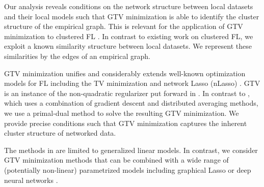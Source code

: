 \documentclass[lettersize,journal]{IEEEtran}
\begin{document}

Our analysis reveals conditions on the network structure between local datasets and their 
local models such that GTV minimization is able to identify the cluster structure of the empirical graph. 
This is relevant for the application of GTV minimization to clustered FL \cite{NIPS2008_fccb3cdc,Ghosh2020}. 
In contrast to existing work on clustered FL, we exploit a known similarity structure between local 
datasets. We represent these similarities by the edges of an empirical graph. 


GTV minimization unifies and considerably extends well-known optimization models for FL 
including the TV minimization and network Lasso (nLasso) \cite{NetworkLasso,LocalizedLinReg2019,Smith2017,Nassif2020}. 
GTV is an instance of the non-quadratic regularizer put forward in \cite{Nassif2020}. 
In contrast to \cite{Nassif2020}, which uses a combination of gradient descent and distributed averaging 
methods, we use a primal-dual method to solve the resulting GTV minimization. We provide precise 
conditions such that GTV minimization captures the inherent cluster structure of networked data. 

The methods in \cite{LocalizedLinReg2019} 
are limited to generalized linear models. In contrast, we consider GTV minimization methods that can be combined 
with a wide range of (potentially non-linear) parametrized models including graphical Lasso or deep neural networks \cite{HastieWainwrightBook,Goodfellow-et-al-2016}. 
\end{document}
